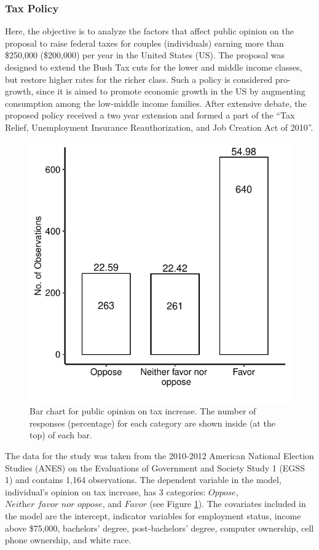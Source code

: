 \hypertarget{subsec:TaxPolicy}{%
\subsubsection{Tax Policy}\label{subsec:TaxPolicy}}

Here, the objective is to analyze the factors that affect public opinion on the proposal to raise federal taxes for couples (individuals) earning more than \$250,000 (\$200,000) per year in the United States (US). The proposal was designed to extend the Bush Tax cuts for the lower and middle income classes, but restore higher rates for the richer class. Such a policy is considered pro-growth, since it is aimed to promote economic growth in the US by augmenting consumption among the low-middle income families. After extensive debate, the proposed policy received a two year extension and formed a part of the ``Tax Relief, Unemployment Insurance Reauthorization, and Job Creation Act of 2010''.

\begin{figure}[b]

{\centering \includegraphics[width=0.4\linewidth,height=0.23\textheight]{TaxFreqDist} 

}

\caption{Bar chart for public opinion on tax increase. The number of responses (percentage) for each category are shown inside (at the top) of each bar.}\label{fig:TaxFreqDist-tab-static}
\end{figure}

The data for the study was taken from the 2010-2012 American National Election Studies (ANES) on the Evaluations of Government and Society Study 1 (EGSS 1) and contains 1,164 observations. The dependent variable in the model, individual's opinion on tax increase, has 3 categories: \(\textit{Oppose}\), \(\textit{Neither favor nor oppose}\), and \(\textit{Favor}\) (see Figure \ref{fig:TaxFreqDist-tab-static}). The covariates included in the model are the intercept, indicator variables for employment status, income above \$75,000, bachelors' degree, post-bachelors' degree, computer ownership, cell phone ownership, and white race.

